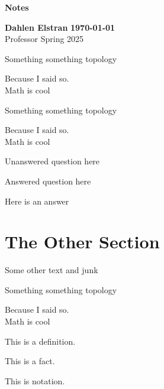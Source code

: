 \documentclass[12pt]{article}
\begin{document}
\begin{newtitle}
  \begin{center}
    \textbf{\Huge Notes}
  \end{center}
  \textbf{Dahlen Elstran} \hfill \textbf{\today} \\
  Professor \hfill Spring 2025
\end{newtitle}

\begin{theorem}
  Something something topology
\end{theorem}
\begin{newproof}
  Because I said so. \\
  Math is cool
\end{newproof}

\begin{theorem}
  Something something topology
\end{theorem}
\begin{newproof}
  Because I said so. \\
  Math is cool
\end{newproof}

\begin{uq}
  Unanswered question here 
\end{uq}

\begin{aq}
  Answered question here 
\end{aq}
\begin{answer}
  Here is an answer
\end{answer}

\section{The Other Section}

Some other text and junk

\begin{theorem}
  Something something topology
\end{theorem}
\begin{newproof}
  Because I said so. \\
  Math is cool
\end{newproof}

\begin{definition}
  This is a definition.
\end{definition}

\begin{fact}
  This is a fact.
\end{fact}

\begin{notation}
  This is notation.
\end{notation}
\end{document}

